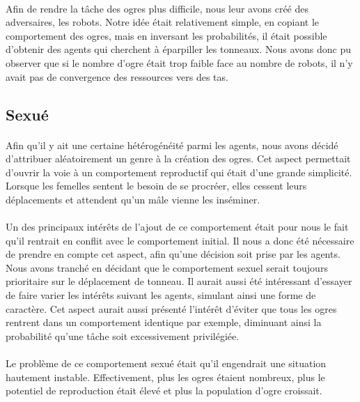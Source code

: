 \paragraph{}
Afin de rendre la tâche des ogres plus difficile, nous leur avons créé des
adversaires, les robots. Notre idée était relativement simple, en copiant le
comportement des ogres, mais en inversant les probabilités, il était possible
d'obtenir des agents qui cherchent à éparpiller les tonneaux. Nous avons donc
pu observer que si le nombre d'ogre était trop faible face au nombre de robots,
il n'y avait pas de convergence des ressources vers des tas.


\subsection{Sexué}
\paragraph{}
Afin qu'il y ait une certaine hétérogénéité parmi les agents, nous avons décidé
d'attribuer aléatoirement un genre à la création des ogres. Cet aspect
permettait d'ouvrir la voie à un comportement reproductif qui était
d'une grande simplicité. Lorsque les femelles sentent le besoin de se
procréer, elles cessent leurs déplacements et attendent qu'un mâle vienne les
inséminer.

\paragraph{}
Un des principaux intérêts de l'ajout de ce comportement était pour nous le fait
qu'il rentrait en conflit avec le comportement initial. Il nous a donc été
nécessaire de prendre en compte cet aspect, afin qu'une décision soit prise par
les agents. Nous avons tranché en décidant que le comportement sexuel serait
toujours prioritaire sur le déplacement de tonneau. Il aurait aussi été
intéressant d'essayer de faire varier les intérêts suivant les agents, simulant
ainsi une forme de caractère. Cet aspect aurait aussi présenté l'intérêt
d'éviter que tous les ogres rentrent dans un comportement identique par exemple,
diminuant ainsi la probabilité qu'une tâche soit excessivement privilégiée.

\paragraph{}
Le problème de ce comportement sexué était qu'il engendrait une situation
hautement instable. Effectivement, plus les ogres étaient nombreux, plus le
potentiel de reproduction était élevé et plus la population d'ogre croissait.

